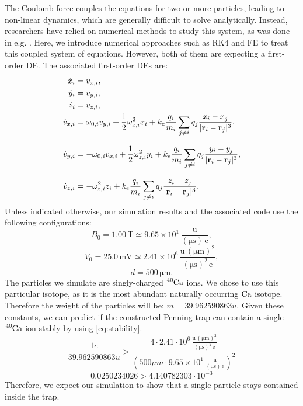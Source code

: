 The Coulomb force couples the equations for two or more particles, leading to non-linear dynamics, which are generally difficult to solve analytically. 
Instead, researchers have relied on numerical methods to study this system, as was done in e.g. \cite{NumericalPenning1}.
Here, we introduce numerical approaches such as RK4 and FE to treat this coupled system of equations. 
However, both of them are expecting a first-order DE. The associated first-order DEs are:
\begin{align} \label{eq: coupledstart}
    \centering
    \dot{x}_i &= v_{x,i}, \\
    \dot{y}_i &= v_{y,i}, \\
    \dot{z}_i &= v_{z,i}, \\
    \dot{v}_{x,i} &= \omega_{0,i} v_{y,i} + \frac{1}{2} \omega_{z,i}^2 x_i + k_e \frac{q_i}{m_i} \sum_{j \neq i} q_j \frac{x_i - x_j}{|\mathbf{r}_i - \mathbf{r}_j|^3}, \label{eq:vstart} \\[8pt] 
    \dot{v}_{y,i} &= -\omega_{0,i} v_{x,i} + \frac{1}{2} \omega_{z,i}^2 y_i + k_e \frac{q_i}{m_i} \sum_{j \neq i} q_j \frac{y_i - y_j}{|\mathbf{r}_i - \mathbf{r}_j|^3}, \\[8pt]
    \dot{v}_{z,i} &= -\omega_{z,i}^2 z_i + k_e \frac{q_i}{m_i} \sum_{j \neq i} q_j \frac{z_i - z_j}{|\mathbf{r}_i - \mathbf{r}_j|^3}. \label{eq: coupledend}
\end{align}
Unless indicated otherwise, our simulation results and the associated code use the following configurations:
\begin{equation*}
    B_0 = 1.00\,\mathrm{T} \simeq 9.65 \times 10^1 \, \frac{\mathrm{u}}{(\mathrm{\mu s}) \, \mathrm{e}},
\end{equation*}
\begin{equation*}
    V_0 = 25.0\,\mathrm{mV} \simeq 2.41 \times 10^6 \, \frac{\mathrm{u} \, (\mathrm{\mu m})^2}{(\mathrm{\mu s})^2 \, \mathrm{e}},
\end{equation*}
\begin{equation*}
    d = 500\,\mathrm{\mu m}.
\end{equation*}
The particles we simulate are singly-charged \(\ce{^{40}Ca}\) ions. We chose to use this particular isotope, as it is the most abundant naturally occurring \(\ce{Ca}\) isotope. \cite{CAWeight} Therefore the weight of the particles will be: $m = 39.962 590 863 u$.
Given these constants, we can predict if the constructed Penning trap can contain a single \(\ce{^{40}Ca}\) ion stably by using \cref{eq:stability}.
\begin{equation*}
    \frac{1 e}{39.962 590 863 u} > \frac{4 \cdot 2.41 \cdot 10^6 \, \frac{\mathrm{u} \, (\mathrm{\mu m})^2}{(\mathrm{\mu s})^2 \, \mathrm{e}}}{\left (500 \mu m \cdot 9.65 \times 10^1 \, \frac{\mathrm{u}}{(\mathrm{\mu s}) \, \mathrm{e}} \right)^2}
\end{equation*}
\begin{equation*}
    0.0250234026 > 4.140782303 \cdot 10^{-3}
\end{equation*}
Therefore, we expect our simulation to show that a single particle stays contained inside the trap.
